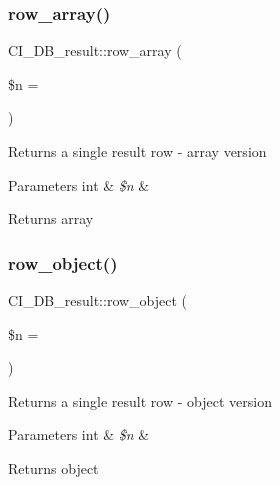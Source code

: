 \subsubsection{\texorpdfstring{row\+\_\+array()}{row\_array()}}
{\footnotesize\ttfamily C\+I\+\_\+\+D\+B\+\_\+result\+::row\+\_\+array (\begin{DoxyParamCaption}\item[{}]{\$n = {} }\end{DoxyParamCaption})}

Returns a single result row -\/ array version


\begin{DoxyParams}[1]{Parameters}
int & {\em \$n} & \\
\hline
\end{DoxyParams}
\begin{DoxyReturn}{Returns}
array 
\end{DoxyReturn}
\mbox{\label{class_c_i___d_b__result_a28b3aef630f4ce3ea9c6c0cca6139d4a}} 
\subsubsection{\texorpdfstring{row\+\_\+object()}{row\_object()}}
{\footnotesize\ttfamily C\+I\+\_\+\+D\+B\+\_\+result\+::row\+\_\+object (\begin{DoxyParamCaption}\item[{}]{\$n = {} }\end{DoxyParamCaption})}

Returns a single result row -\/ object version


\begin{DoxyParams}[1]{Parameters}
int & {\em \$n} & \\
\hline
\end{DoxyParams}
\begin{DoxyReturn}{Returns}
object 
\end{DoxyReturn}
\mbox{\label{class_c_i___d_b__result_a4bef6ee465f69e62ee84cb1b9186219f}} 

